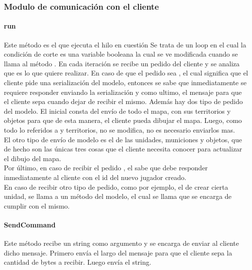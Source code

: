     \subsubsection{Modulo de comunicación con el cliente}
        \paragraph{run}
            Este método es el que ejecuta el hilo en cuestión Se trata de un
            loop en el cual la condición de corte es una variable booleana la
            cual se ve modificada cuando se llama al método .
            En cada iteración se recibe un pedido del cliente y se analiza
            que es lo que quiere realizar. En caso de que el pedido sea
            , el cual significa que el cliente pide una
            serialización del modelo, entonces se sabe que inmediatamente se
            requiere responder enviando la serialización y como ultimo, el
            mensaje  para que el cliente sepa cuando dejar de
            recibir el mismo.
            Además hay dos tipo de pedido del modelo. El inicial consta del
            envío de todo el mapa, con sus territorios y objetos para que de
            esta manera, el cliente pueda dibujar el mapa. Luego, como todo lo
            referidos a  y territorios, no se modifica, no es
            necesario enviarlos mas.\\
            El otro tipo de envío de modelo es el de las unidades, municiones y
            objetos, que de hecho son las únicas tres cosas que el cliente
            necesita conocer para actualizar el dibujo del mapa.\\
            Por último, en caso de recibir el pedido , el
             sabe que debe responder inmediatamente al
            cliente con el id del nuevo jugador creado.\\
            En caso de recibir otro tipo de pedido, como por ejemplo, el de
            crear cierta unidad, se llama a un método del modelo, el cual se llama
              que se encarga de cumplir con el mismo.
        \paragraph{SendCommand}
            Este método recibe un string como argumento y se encarga de enviar
            al cliente dicho mensaje. Primero envía el largo del mensaje para
            que el cliente sepa la cantidad de bytes a recibir. Luego envía el
            string.
